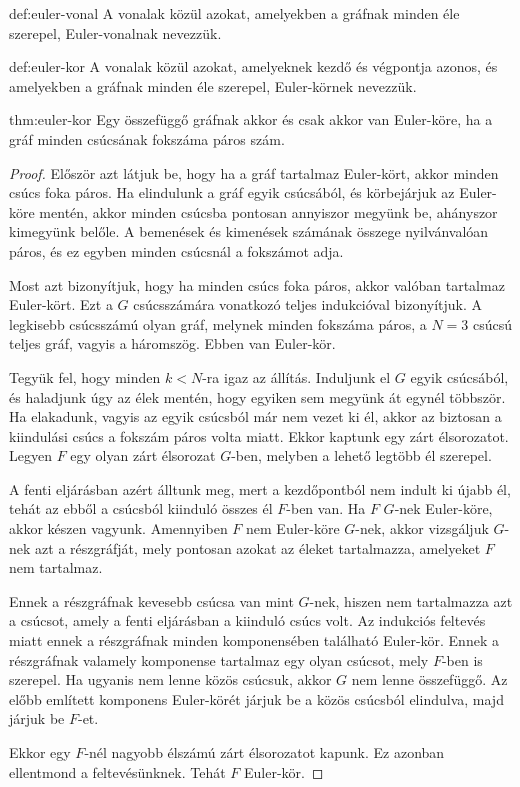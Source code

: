 \begin{definition}{def:euler-vonal}
    A vonalak közül azokat, amelyekben a gráfnak minden éle szerepel, Euler-vonalnak nevezzük.
\end{definition}

\begin{definition}{def:euler-kor}
    A vonalak közül azokat, amelyeknek kezdő és végpontja azonos, és amelyekben a gráfnak minden éle szerepel, Euler-körnek nevezzük.
\end{definition}

\begin{theorem}{thm:euler-kor}
    Egy összefüggő gráfnak akkor és csak akkor van Euler-köre, ha a gráf minden csúcsának fokszáma páros szám.
\end{theorem}

\begin{proof}
    Először azt látjuk be, hogy ha a gráf tartalmaz Euler-kört, akkor minden csúcs foka páros.
    Ha elindulunk a gráf egyik csúcsából, és körbejárjuk az Euler-köre mentén, akkor minden csúcsba pontosan annyiszor megyünk be, ahányszor kimegyünk belőle.
    A bemenések és kimenések számának összege nyilvánvalóan páros, és ez egyben minden csúcsnál a fokszámot adja.
    
    Most azt bizonyítjuk, hogy ha minden csúcs foka páros, akkor valóban tartalmaz Euler-kört.
    Ezt a $G$ csúcsszámára vonatkozó teljes indukcióval bizonyítjuk.
    A legkisebb csúcsszámú olyan gráf, melynek minden fokszáma páros, a $N=3$ csúcsú teljes gráf, vagyis a háromszög.
    Ebben van Euler-kör.
    
    Tegyük fel, hogy minden $k<N$-ra igaz az állítás.
    Induljunk el $G$ egyik csúcsából, és haladjunk úgy az élek mentén, hogy egyiken sem megyünk át egynél többször.
    Ha elakadunk, vagyis az egyik csúcsból már nem vezet ki él, akkor az biztosan a kiindulási csúcs a fokszám páros volta miatt.
    Ekkor kaptunk egy zárt élsorozatot.
    Legyen $F$ egy olyan zárt élsorozat $G$-ben, melyben a lehető legtöbb él szerepel.
    
    A fenti eljárásban azért álltunk meg, mert a kezdőpontból nem indult ki újabb él, tehát az ebből a csúcsból kiinduló összes él $F$-ben van.
    Ha $F$ $G$-nek Euler-köre, akkor készen vagyunk.
    Amennyiben $F$ nem Euler-köre $G$-nek, akkor vizsgáljuk $G$-nek azt a részgráfját, mely pontosan azokat az éleket tartalmazza, amelyeket $F$ nem tartalmaz.
    
    Ennek a részgráfnak kevesebb csúcsa van mint $G$-nek, hiszen nem tartalmazza azt a csúcsot, amely a fenti eljárásban a kiinduló csúcs volt.
    Az indukciós feltevés miatt ennek a részgráfnak minden komponensében található Euler-kör.
    Ennek a részgráfnak valamely komponense tartalmaz egy olyan csúcsot, mely $F$-ben is szerepel.
    Ha ugyanis nem lenne közös csúcsuk, akkor $G$ nem lenne összefüggő.
    Az előbb említett komponens Euler-körét járjuk be a közös csúcsból elindulva, majd járjuk be $F$-et.
    
    Ekkor egy $F$-nél nagyobb élszámú zárt élsorozatot kapunk.
    Ez azonban ellentmond a feltevésünknek.
    Tehát $F$ Euler-kör.
\end{proof}

